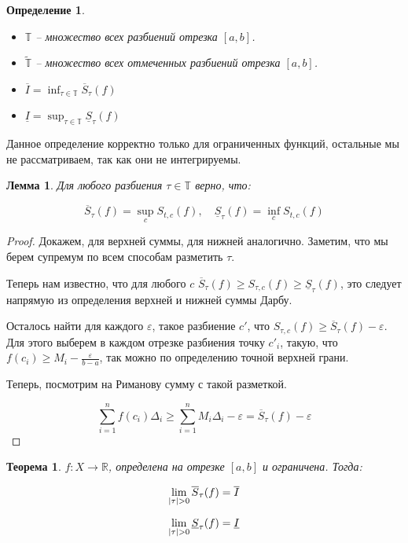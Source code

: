 \documentclass{article}
\theoremstyle{plain}
\newtheorem{theorem}{Теорема}
\newtheorem{lemma}{Лемма}
\newtheorem{definition}{Определение}
\theoremstyle{definition}
\theoremstyle{remark}
\renewcommand{\*}{\cdot}
\def\eps{\varepsilon}
\begin{document}
\begin{definition}
~\
    \begin{itemize}
        \item $\mathbb{T}$ -- множество всех разбиений отрезка $[a, b]$.
        \item $\mathbb{\widetilde{T}}$ -- множество всех отмеченных разбиений отрезка $[a, b]$.
        \item $\overline{I} = \inf_{\tau \in \mathbb{T}} \overline{S}_\tau(f)$
        \item $\underline{I} = \sup_{\tau \in \mathbb{T}} \underline{S}_\tau(f)$
    \end{itemize}

\end{definition}

Данное определение корректно только для ограниченных функций, остальные мы не рассматриваем, так как они 
не интегрируемы. 

\begin{lemma}
    Для любого разбиения $\tau \in \mathbb{T}$ верно, что:
    
    \[ 
        \overline{S}_{\tau}(f) = \sup_{c} S_{t, c}(f), \quad \underline{S}_{\tau}(f) = \inf_{c} S_{t, c}(f)
    \]
\end{lemma}

\begin{proof}
    Докажем, для верхней суммы, для нижней аналогично. Заметим, что мы берем супремум по всем способам разметить $\tau$.

    Теперь нам известно, что для любого $c$ $ \overline{S}_{\tau}(f) \geq S_{\tau, c}(f) \geq \underline{S}_{\tau}(f)$, это следует напрямую 
    из определения верхней и нижней суммы Дарбу.
    
    Осталось найти для каждого $\varepsilon$, такое разбиение $c'$, что $ S_{\tau, c}(f) \geq \overline{S}_{\tau}(f) - \eps$. 
    Для этого выберем в каждом отрезке разбиения точку $c'_i$, такую, что $f(c_i) \geq M_i - \frac{\eps}{b - a}$, так можно по определению 
    точной верхней грани.

    Теперь, посмотрим на Риманову сумму с такой разметкой.

    \[
        \sum_{i = 1}^n f(c_i) \Delta_i \geq \sum_{i = 1}^n M_i \Delta_i - \eps = \overline{S}_{\tau} (f) - \eps
    \] 

\end{proof}

\begin{theorem}
    $f: X \rightarrow \mathbb{R}$, определена на отрезке $[a, b]$ и ограничена. Тогда:

    \[
        \lim_{|\tau| \-> 0} \overline{S}_{\tau}(f) = \overline{I}
    \]

    \[
        \lim_{|\tau| \-> 0} \underline{S}_{\tau}(f) = \underline{I}
    \]
\end{theorem}
\end{document}
